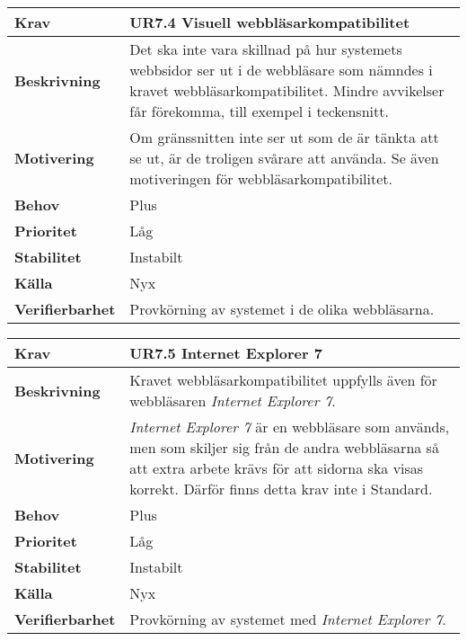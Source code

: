 \documentclass[a4paper, twoside, 11pt, titlepage]{article}
\begin{document}
		\begin {table} [ht] \begin{tabular} { p{2.6cm} p{12.5cm} }
			\hline
			{\sffamily\textbf{Krav}} & {\sffamily\textbf{UR7.4 Visuell webbläsarkompatibilitet}} \\
			\hline
			{\sffamily\textbf{Beskrivning}} & {Det ska inte vara skillnad på hur systemets webbsidor ser ut i de webbläsare som nämndes i kravet webbläsarkompatibilitet. Mindre avvikelser får förekomma, till exempel i teckensnitt.} \\
			\hline
			{\sffamily\textbf{Motivering}} & {Om gränssnitten inte ser ut som de är tänkta att se ut, är de troligen svårare att använda. Se även motiveringen för webbläsarkompatibilitet.} \\
			\hline
			{\sffamily\textbf{Behov}} & {Plus} \\
			\hline
			{\sffamily\textbf{Prioritet}} & {Låg} \\
			\hline
			{\sffamily\textbf{Stabilitet}} & {Instabilt} \\
			\hline
			{\sffamily\textbf{Källa}} & {Nyx} \\
			\hline
			{\sffamily\textbf{Verifierbarhet}} & {Provkörning av systemet i de olika webbläsarna.} \\
			\hline
		\end{tabular} \end{table} \FloatBarrier
		\vspace{6mm}

		\begin {table} [ht] \begin{tabular} { p{2.6cm} p{12.5cm} }
			\hline
			{\sffamily\textbf{Krav}} & {\sffamily\textbf{UR7.5 Internet Explorer 7}} \\
			\hline
			{\sffamily\textbf{Beskrivning}} & {Kravet webbläsarkompatibilitet uppfylls även för webbläsaren \emph{Internet Explorer 7}.} \\
			\hline
			{\sffamily\textbf{Motivering}} & { \emph{Internet Explorer 7} är en webbläsare som används, men som skiljer sig från de andra webbläsarna så att extra arbete krävs för att sidorna ska visas korrekt. Därför finns detta krav inte i Standard.} \\
			\hline
			{\sffamily\textbf{Behov}} & {Plus} \\
			\hline
			{\sffamily\textbf{Prioritet}} & {Låg} \\
			\hline
			{\sffamily\textbf{Stabilitet}} & {Instabilt} \\
			\hline
			{\sffamily\textbf{Källa}} & {Nyx} \\
			\hline
			{\sffamily\textbf{Verifierbarhet}} & {Provkörning av systemet med \emph{Internet Explorer 7}.} \\
			\hline
		\end{tabular} \end{table} \FloatBarrier
\end{document}
